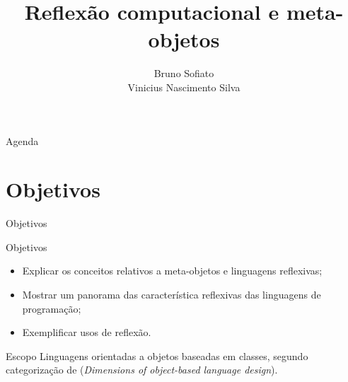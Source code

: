 \documentclass[12pt,t]{beamer}
\institute{POO 2015\\IME -- USP}
\author{Bruno Sofiato\\Vinicius Nascimento Silva}
\title{Reflexão computacional e meta-objetos}
\begin{document}
\abovedisplayskip=0pt
\abovedisplayshortskip=0pt
\belowdisplayskip=0pt
\belowdisplayshortskip=0pt	
 \frame{\titlepage}
 \begin{frame}{Agenda}
	\tableofcontents
 \end{frame}
 \section{Objetivos}
 \begin{frame}{Objetivos}
 	\begin{block}{Objetivos}
 		\begin{itemize}
 			\item Explicar os conceitos relativos a meta-objetos e linguagens reflexivas;
 			\item Mostrar um panorama das característica reflexivas das linguagens de programação;
 			\item Exemplificar usos de reflexão.
 		\end{itemize}
 	\end{block}
 	\begin{block}{Escopo}
 		Linguagens orientadas a objetos baseadas em classes, segundo categorização de  (\emph{Dimensions of object-based language design}).
 	\end{block}
 \end{frame}
\end{document}
